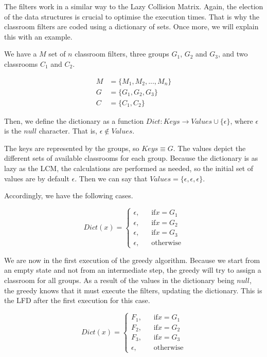 The filters work in a similar way to the Lazy Collision Matrix. Again, the election of the data structures is crucial to optimise the execution times. That is why the classroom filters are coded using a dictionary of sets. Once more, we will explain this with an example.

We have a $M$ set of $n$ classroom filters, three groups $G_{1}$, $G_{2}$ and $G_{3}$, and two classrooms $C_{1}$ and $C_{2}$.

\begin{align}
    M &= \{ M_{1}, M_{2}, ..., M_{n} \}\\
    G &= \{ G_{1}, G_{2}, G_{3} \}\\
    C &= \{ C_{1}, C_{2} \}
\end{align}

Then, we define the dictionary as a function $Dict: Keys \rightarrow Values \cup \{ \epsilon \}$, where $\epsilon$ is the $null$ character. That is, $\epsilon \notin Values$.

The keys are represented by the groups, so $Keys \equiv G$. The values depict the different sets of available classrooms for each group. Because the dictionary is as lazy as the LCM, the calculations are performed as needed, so the initial set of values are by default $\epsilon$. Then we can say that $Values = \{ \epsilon, \epsilon, \epsilon \}$.

Accordingly, we have the following cases.

\[
    Dict(x) =
    \begin{cases}
        \epsilon\text{,} &\quad\text{if} x = G_{1}\\
        \epsilon\text{,} &\quad\text{if} x = G_{2}\\
        \epsilon\text{,} &\quad\text{if} x = G_{3}\\
        \epsilon\text{,} &\quad\text{otherwise}
    \end{cases}
\]

We are now in the first execution of the greedy algorithm. Because we start from an empty state and not from an intermediate step, the greedy will try to assign a classroom for all groups. As a result of the values in the dictionary being $null$, the greedy knows that it must execute the filters, updating the dictionary. This is the LFD after the first execution for this case.

\[
    Dict(x) =
    \begin{cases}
        F_{1}\text{,} &\quad\text{if} x = G_{1}\\
        F_{2}\text{,} &\quad\text{if} x = G_{2}\\
        F_{3}\text{,} &\quad\text{if} x = G_{3}\\
        \epsilon\text{,} &\quad\text{otherwise}
    \end{cases}
\]

